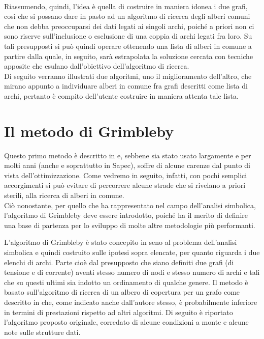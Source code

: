 \paragraph{}
Riassumendo, quindi, l'idea è quella di costruire in maniera idonea i due grafi, così che si possano dare in pasto ad un algoritmo di ricerca degli alberi comuni che non debba preoccuparsi dei dati legati ai singoli archi, poiché a priori non ci sono riserve sull'inclusione o esclusione di una coppia di archi legati fra loro. Su tali presupposti si può quindi operare ottenendo una lista di alberi in comune a partire dalla quale, in seguito, sarà estrapolata la soluzione cercata con tecniche apposite che esulano dall'obiettivo dell'algoritmo di ricerca.\\
Di seguito verranno illustrati due algoritmi, uno il miglioramento dell'altro, che mirano appunto a individuare alberi in comune fra grafi descritti come lista di archi, pertanto è compito dell'utente costruire in maniera attenta tale lista.



\section{Il metodo di Grimbleby}

Questo primo metodo è descritto in \cite{Grimbleby} e, sebbene sia stato usato largamente e per molti anni (anche e soprattutto in Sapec), soffre di alcune carenze dal punto di vista dell'ottimizzazione. Come vedremo in seguito, infatti, con pochi semplici accorgimenti si può evitare di percorrere alcune strade che si rivelano a priori sterili, alla ricerca di alberi in comune.\\
Ciò nonostante, per quello che ha rappresentato nel campo dell'analisi simbolica, l'algoritmo di Grimbleby deve essere introdotto, poiché ha il merito di definire una base di partenza per lo sviluppo di molte altre metodologie più performanti.

L'algoritmo di Grimbleby è stato concepito in seno al problema dell'analisi simbolica e quindi costruito sulle ipotesi sopra elencate, per quanto riguarda i due elenchi di archi. Parte cioè dal presupposto che siano definiti due grafi (di tensione e di corrente) aventi stesso numero di nodi e stesso numero di archi e tali che su questi ultimi sia indotto un ordinamento di qualche genere. Il metodo è basato sull'algoritmo di ricerca di un albero di copertura per un grafo come descritto in \cite{GraphTheory} che, come indicato anche dall'autore stesso, è probabilmente inferiore in termini di prestazioni rispetto ad altri algoritmi. Di seguito è riportato l'algoritmo proposto originale, corredato di alcune condizioni a monte e alcune note sulle strutture dati.

